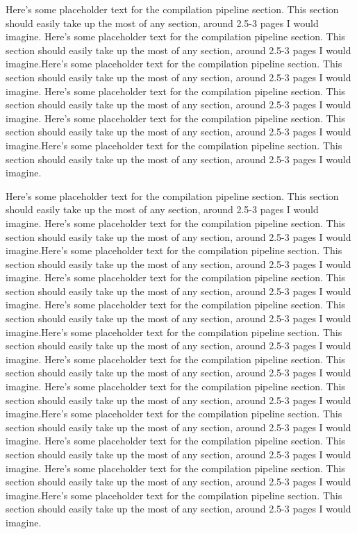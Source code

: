 \documentclass[preprint]{sigplanconf}
\begin{document}
Here's some placeholder text for the compilation pipeline section.  This
section should easily take up the most of any section, around 2.5-3 pages I
would imagine.
Here's some placeholder text for the compilation pipeline section.  This
section should easily take up the most of any section, around 2.5-3 pages I
would imagine.Here's some placeholder text for the compilation pipeline section.
 This
section should easily take up the most of any section, around 2.5-3 pages I
would imagine.
Here's some placeholder text for the compilation pipeline section.  This
section should easily take up the most of any section, around 2.5-3 pages I
would imagine.
Here's some placeholder text for the compilation pipeline section.  This
section should easily take up the most of any section, around 2.5-3 pages I
would imagine.Here's some placeholder text for the compilation pipeline section.
 This
section should easily take up the most of any section, around 2.5-3 pages I
would imagine.

Here's some placeholder text for the compilation pipeline section.  This
section should easily take up the most of any section, around 2.5-3 pages I
would imagine.
Here's some placeholder text for the compilation pipeline section.  This
section should easily take up the most of any section, around 2.5-3 pages I
would imagine.Here's some placeholder text for the compilation pipeline section.
 This
section should easily take up the most of any section, around 2.5-3 pages I
would imagine.
Here's some placeholder text for the compilation pipeline section.  This
section should easily take up the most of any section, around 2.5-3 pages I
would imagine.
Here's some placeholder text for the compilation pipeline section.  This
section should easily take up the most of any section, around 2.5-3 pages I
would imagine.Here's some placeholder text for the compilation pipeline section.
 This
section should easily take up the most of any section, around 2.5-3 pages I
would imagine.
Here's some placeholder text for the compilation pipeline section.  This
section should easily take up the most of any section, around 2.5-3 pages I
would imagine.
Here's some placeholder text for the compilation pipeline section.  This
section should easily take up the most of any section, around 2.5-3 pages I
would imagine.Here's some placeholder text for the compilation pipeline section.
 This
section should easily take up the most of any section, around 2.5-3 pages I
would imagine.
Here's some placeholder text for the compilation pipeline section.  This
section should easily take up the most of any section, around 2.5-3 pages I
would imagine.
Here's some placeholder text for the compilation pipeline section.  This
section should easily take up the most of any section, around 2.5-3 pages I
would imagine.Here's some placeholder text for the compilation pipeline section.
 This
section should easily take up the most of any section, around 2.5-3 pages I
would imagine.
\end{document}
